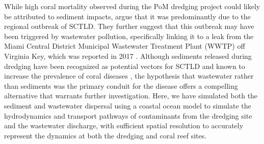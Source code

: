 \documentclass[preprint,12pt,authoryear]{elsarticle}
\begin{document}
While high coral mortality observed during the PoM dredging project could likely be attributed to sediment impacts, \cite{gintert2019regional} argue that it was predominantly due to the regional outbreak of SCTLD. They further suggest that this outbreak may have been triggered by wastewater pollution, specifically linking it to a leak from the Miami Central District Municipal Wastewater Treatment Plant (WWTP) off Virginia Key, which was reported in 2017 \citep{staletovich2017}. Although sediments released during dredging have been recognized as potential vectors for SCTLD \citep{studivan2022reef} and known to increase the prevalence of coral diseases \citep{pollock2014sediment}, the hypothesis that wastewater rather than sediments was the primary conduit for the disease offers a compelling alternative that warrants further investigation. Here, we have simulated both the sediment and wastewater dispersal using a coastal ocean model to simulate the hydrodynamics and transport pathways of contaminants from the dredging site and the wastewater discharge, with sufficient spatial resolution to accurately represent the dynamics at both the dredging and coral reef sites.
\end{document}
